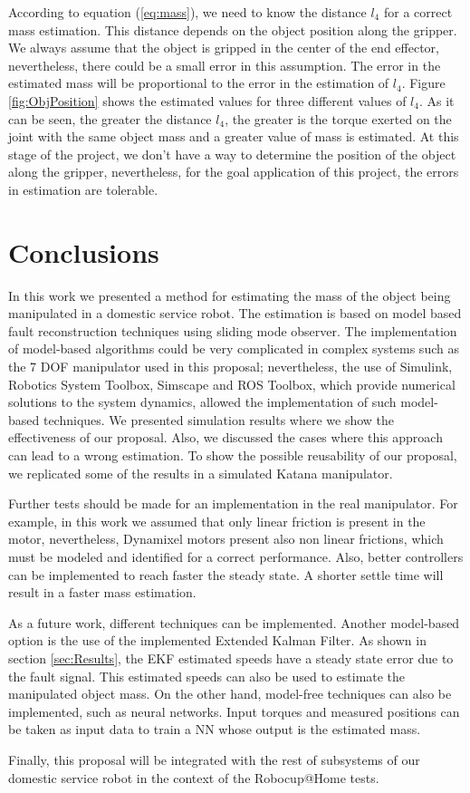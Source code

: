 \documentclass[conference,letterpaper]{ieeeconf}
\begin{document}
According to equation (\ref{eq:mass}), we need to know the distance $l_4$ for a correct mass estimation. This distance depends on the object position along the gripper. We always assume that the object is gripped in the center of the end effector, nevertheless, there could be a small error in this assumption. The error in the estimated mass will be proportional to the error in the estimation of $l_4$. Figure \ref{fig:ObjPosition} shows the estimated values for three different values of $l_4$. As it can be seen, the greater the distance $l_4$, the greater is the torque exerted on the joint with the same object mass and a greater value of mass is estimated. At this stage of the project, we don't have a way to determine the position of the object along the gripper, nevertheless, for the goal application of this project, the errors in estimation are tolerable. 

\section{Conclusions}
\label{sec:Conclusions}
In this work we presented a method for estimating the mass of the object being manipulated in a domestic service robot. The estimation is based on model based fault reconstruction techniques using sliding mode observer. The implementation of model-based algorithms could be very complicated in complex systems such as the 7 DOF manipulator used in this proposal; nevertheless, the use of Simulink, Robotics System Toolbox, Simscape and ROS Toolbox, which provide numerical solutions to the system dynamics, allowed the implementation of such model-based techniques. We presented simulation results where we show the effectiveness of our proposal. Also, we discussed the cases where this approach can lead to a wrong estimation. To show the possible reusability of our proposal, we replicated some of the results in a simulated Katana manipulator. 

Further tests should be made for an implementation in the real manipulator. For example, in this work we assumed that only linear friction is present in the motor, nevertheless, Dynamixel motors present also non linear frictions, which must be modeled and identified for a correct performance. Also, better controllers can be implemented to reach faster the steady state. A shorter settle time will result in a faster mass estimation. 

As a future work, different techniques can be implemented. Another model-based option is the use of the implemented Extended Kalman Filter. As shown in section \ref{sec:Results}, the EKF estimated speeds have a steady state error due to the fault signal. This estimated speeds can also be used to estimate the manipulated object mass. On the other hand, model-free techniques can also be implemented, such as neural networks. Input torques and measured positions can be taken as input data to train a NN whose output is the estimated mass.

Finally, this proposal will be integrated with the rest of subsystems of our domestic service robot in the context of the Robocup@Home tests. 




\end{document}
